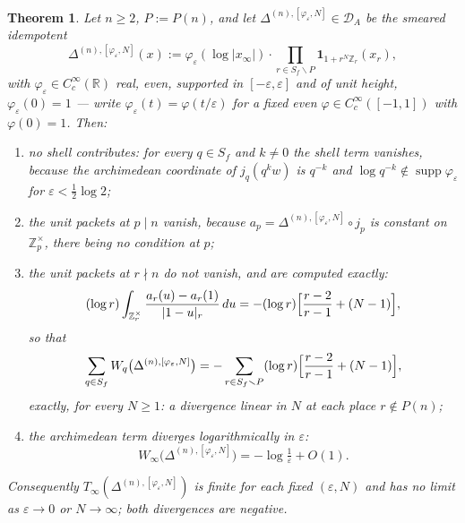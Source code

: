 \documentclass[11pt]{amsart}
\newtheorem{theorem}{Theorem}[section]
\theoremstyle{definition}
\theoremstyle{remark}
\newcommand{\R}{\mathbb R}
\newcommand{\Z}{\mathbb Z}
\newcommand{\supp}{\operatorname{supp}}
\newcommand{\DA}{\mathcal D_A}
\begin{document}
\begin{theorem}\label{thm:gramdiag}
Let $n\ge2$, $P:=P(n)$, and let $\Delta^{(n),[\varphi_\varepsilon,N]}\in\DA$ be
the smeared idempotent
\[
  \Delta^{(n),[\varphi_\varepsilon,N]}(x)
   :=\varphi_\varepsilon(\log|x_\infty|)\cdot
     \prod_{r\in S_f\smallsetminus P}\mathbf 1_{1+r^N\Z_r}(x_r),
\]
with $\varphi_\varepsilon\in C_c^\infty(\R)$ real, even, supported in
$[-\varepsilon,\varepsilon]$ and of \emph{unit height},
$\varphi_\varepsilon(0)=1$ --- write $\varphi_\varepsilon(t)=\varphi(t/\varepsilon)$
for a fixed even $\varphi\in C_c^\infty([-1,1])$ with $\varphi(0)=1$. Then:
\begin{enumerate}
\item[(i)] no shell contributes: for every $q\in S_f$ and $k\ne0$ the shell
term vanishes, because the archimedean coordinate of $j_q(q^kw)$ is $q^{-k}$
and $\log q^{-k}\notin\supp\varphi_\varepsilon$ for $\varepsilon<\tfrac12\log2$;
\item[(ii)] the unit packets at $p\mid n$ vanish, because
$a_p=\Delta^{(n),[\varphi_\varepsilon,N]}\circ j_p$ is constant on
$\Z_p^\times$, there being no condition at $p$;
\item[(iii)] the unit packets at $r\nmid n$ do not vanish, and are computed
exactly:
\begin{equation}\label{eq:unitpacket}
  (\log r)\int_{\Z_r^\times}\frac{a_r(u)-a_r(1)}{|1-u|_r}\,du
   =-(\log r)\Bigl[\frac{r-2}{r-1}+(N-1)\Bigr],
\end{equation}
so that
\begin{equation}\label{eq:unitpackettotal}
  \sum_{q\in S_f}W_q\bigl(\Delta^{(n),[\varphi_\varepsilon,N]}\bigr)
   =-\sum_{r\in S_f\smallsetminus P}(\log r)
     \Bigl[\frac{r-2}{r-1}+(N-1)\Bigr],
\end{equation}
exactly, for every $N\ge1$: a divergence linear in $N$ at each place
$r\notin P(n)$;
\item[(iv)] the archimedean term diverges logarithmically in $\varepsilon$:
\begin{equation}\label{eq:archdiverges}
  W_\infty\bigl(\Delta^{(n),[\varphi_\varepsilon,N]}\bigr)
   =-\log\tfrac1\varepsilon+O(1).
\end{equation}
\end{enumerate}
Consequently $T_\infty(\Delta^{(n),[\varphi_\varepsilon,N]})$ is finite for each
fixed $(\varepsilon,N)$ and has no limit as $\varepsilon\to0$ or
$N\to\infty$; both divergences are negative.
\end{theorem}
\end{document}
